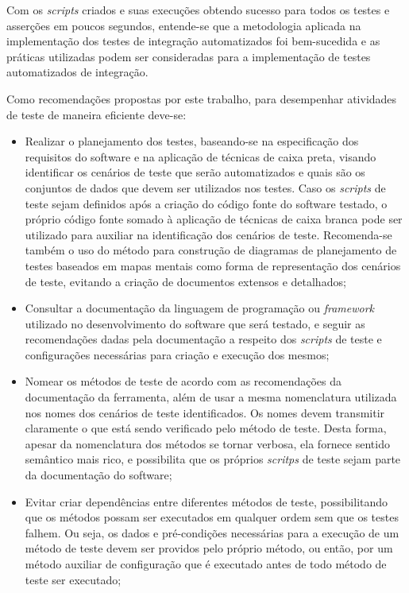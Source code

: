     Com os \emph{scripts} criados e suas execuções obtendo sucesso para todos os testes e asserções em poucos segundos, entende-se que a metodologia aplicada na implementação dos testes de integração automatizados foi bem-sucedida e as práticas utilizadas podem ser consideradas para a implementação de testes automatizados de integração. 
    
    Como recomendações propostas por este trabalho, para desempenhar atividades de teste de maneira eficiente deve-se:
    
    \begin{itemize}
        \item Realizar o planejamento dos testes, baseando-se na especificação dos requisitos do software e na aplicação de técnicas de caixa preta, visando identificar os cenários de teste que serão automatizados e quais são os conjuntos de dados que devem ser utilizados nos testes. Caso os \emph{scripts} de teste sejam definidos após a criação do código fonte do software testado, o próprio código fonte somado à aplicação de técnicas de caixa branca pode ser utilizado para auxiliar na identificação dos cenários de teste. Recomenda-se também o uso do método para construção de diagramas de planejamento de testes baseados em mapas mentais como forma de representação dos cenários de teste, evitando a criação de documentos extensos e detalhados;
        \item Consultar a documentação da linguagem de programação ou \emph{framework} utilizado no desenvolvimento do software que será testado, e seguir as recomendações dadas pela documentação a respeito dos \emph{scripts} de teste e configurações necessárias para criação e execução dos mesmos;
        \item Nomear os métodos de teste de acordo com as recomendações da documentação da ferramenta, além de usar a mesma nomenclatura utilizada nos nomes dos cenários de teste identificados. Os nomes devem transmitir claramente o que está sendo verificado pelo método de teste. Desta forma, apesar da nomenclatura dos métodos se tornar verbosa, ela fornece sentido semântico mais rico, e possibilita que os próprios \emph{scritps} de teste sejam parte da documentação do software;
        \item Evitar criar dependências entre diferentes métodos de teste, possibilitando que os métodos possam ser executados em qualquer ordem sem que os testes falhem. Ou seja, os dados e pré-condições necessárias para a execução de um método de teste devem ser providos pelo próprio método, ou então, por um método auxiliar de configuração que é executado antes de todo método de teste ser executado;

\end{itemize}
